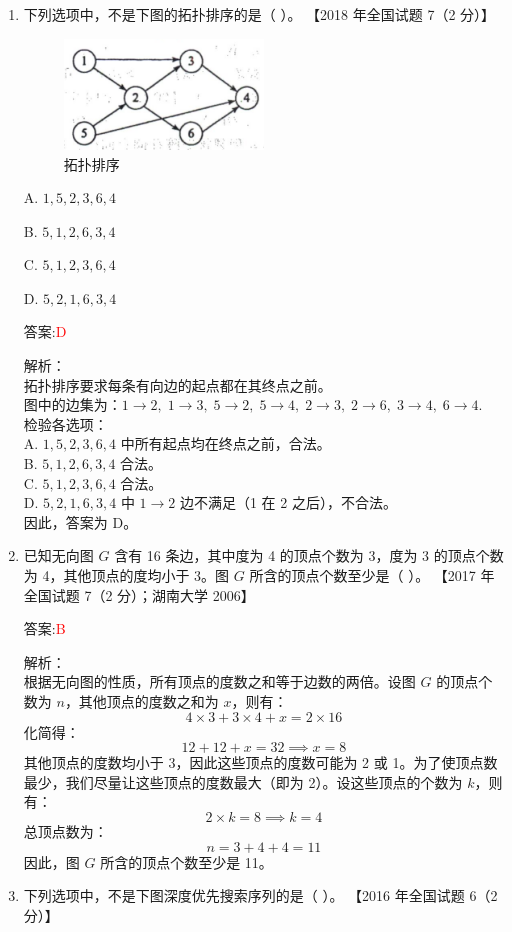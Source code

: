 \documentclass[lang=cn,newtx,10pt,scheme=chinese]{../../../elegantbook}
\begin{document}
\begin{enumerate}
    \item 下列选项中，不是下图的拓扑排序的是（ ）。  
    【2018 年全国试题 7（2 分）】  

    \begin{figure}[h!]
            \centering
            \includegraphics[width=0.5\textwidth]{../../figure/exercisePicPDF/chapter7/7-3.pdf}
            \caption{拓扑排序}
    \end{figure}

    A. $1, 5, 2, 3, 6, 4$  

    B. $5, 1, 2, 6, 3, 4$  

    C. $5, 1, 2, 3, 6, 4$  

    D. $5, 2, 1, 6, 3, 4$  
    
    答案:\textcolor{red}{D}

    解析：\\
    拓扑排序要求每条有向边的起点都在其终点之前。\\
    图中的边集为：$1\to2,\;1\to3,\;5\to2,\;5\to4,\;2\to3,\;2\to6,\;3\to4,\;6\to4$.\\
    检验各选项：\\
    A. $1,5,2,3,6,4$ 中所有起点均在终点之前，合法。\\
    B. $5,1,2,6,3,4$ 合法。\\
    C. $5,1,2,3,6,4$ 合法。\\
    D. $5,2,1,6,3,4$ 中 $1\to2$ 边不满足（1 在 2 之后），不合法。\\
    因此，答案为 D。\\
    \item 已知无向图 $G$ 含有 16 条边，其中度为 4 的顶点个数为 3，度为 3 的顶点个数为 4，其他顶点的度均小于 3。图 $G$ 所含的顶点个数至少是（ ）。  
    【2017 年全国试题 7（2 分）；湖南大学 2006】  

    答案:\textcolor{red}{B}

    解析：\\
    根据无向图的性质，所有顶点的度数之和等于边数的两倍。设图 $G$ 的顶点个数为 $n$，其他顶点的度数之和为 $x$，则有：  
    \[
    4 \times 3 + 3 \times 4 + x = 2 \times 16
    \]
    化简得：  
    \[
    12 + 12 + x = 32 \implies x = 8
    \]
    其他顶点的度数均小于 3，因此这些顶点的度数可能为 2 或 1。为了使顶点数最少，我们尽量让这些顶点的度数最大（即为 2）。设这些顶点的个数为 $k$，则有：  
    \[
    2 \times k = 8 \implies k = 4
    \]
    总顶点数为：  
    \[
    n = 3 + 4 + 4 = 11
    \]
    因此，图 $G$ 所含的顶点个数至少是 11。
    \item 下列选项中，不是下图深度优先搜索序列的是（ ）。  
    【2016 年全国试题 6（2 分）】  


\end{enumerate}
\end{document}
